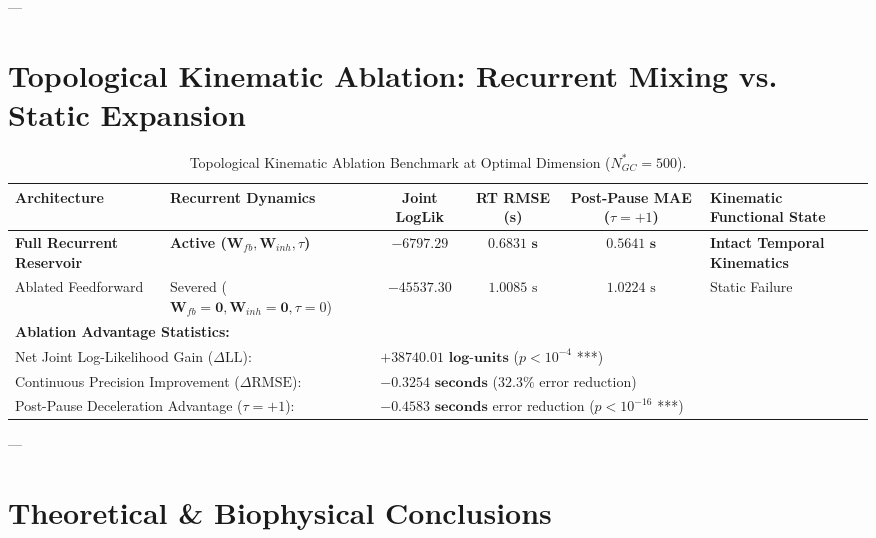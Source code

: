 \documentclass[11pt,twoside,a4paper]{article}
\begin{document}
---

\section{Topological Kinematic Ablation: Recurrent Mixing vs. Static Expansion}

\begin{table}[H]
\centering
\caption{Topological Kinematic Ablation Benchmark at Optimal Dimension ($N_{GC}^* = 500$).}
\label{tab:kinematic_ablation}
\vspace{0.4em}
\begin{adjustbox}{width=\textwidth,center}
\begin{tabular}{l l c c c l}
\toprule
\textbf{Architecture} & \textbf{Recurrent Dynamics} & \textbf{Joint LogLik} & \textbf{RT RMSE (s)} & \textbf{Post-Pause MAE ($\tau=+1$)} & \textbf{Kinematic Functional State} \\
\midrule
\textbf{Full Recurrent Reservoir} & \textbf{Active ($\mathbf{W}_{fb}, \mathbf{W}_{inh}, \tau$)} & $\mathbf{-6797.29}$ & $\mathbf{0.6831\text{ s}}$ & $\mathbf{0.5641\text{ s}}$ & \textbf{Intact Temporal Kinematics} \\
Ablated Feedforward & Severed ($\mathbf{W}_{fb}=\mathbf{0}, \mathbf{W}_{inh}=\mathbf{0}, \tau=0$) & $-45537.30$ & $1.0085\text{ s}$ & $1.0224\text{ s}$ & Static Failure \\
\midrule
\multicolumn{6}{l}{\textbf{Ablation Advantage Statistics:}} \\
\multicolumn{2}{l}{Net Joint Log-Likelihood Gain ($\Delta \text{LL}$):} & \multicolumn{4}{l}{$\mathbf{+38740.01\text{ log-units}}$ ($p < 10^{-4}$ ***)} \\
\multicolumn{2}{l}{Continuous Precision Improvement ($\Delta \text{RMSE}$):} & \multicolumn{4}{l}{$\mathbf{-0.3254\text{ seconds}}$ ($32.3\%$ error reduction)} \\
\multicolumn{2}{l}{Post-Pause Deceleration Advantage ($\tau = +1$):} & \multicolumn{4}{l}{$\mathbf{-0.4583\text{ seconds}}$ error reduction ($p < 10^{-16}$ ***)} \\
\bottomrule
\end{tabular}
\end{adjustbox}
\end{table}

---

\section{Theoretical \& Biophysical Conclusions}
\end{document}
